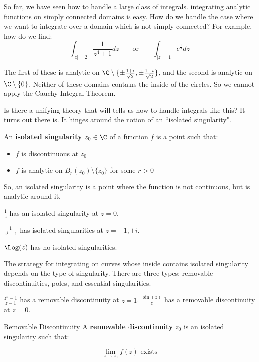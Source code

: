 So far, we have seen how to handle a large class of integrals. integrating analytic functions on simply connected domains is easy. How do we handle the case where we want to integrate over a domain which is not simply connected? For example, how do we find:
$$\int_{|z| = 2} \frac{1}{z^4 + 1}dz \qquad \text{or} \qquad \int_{|z| = 1}e^{\frac{1}{z}}dz$$

The first of these is analytic on $\C\setminus\{\pm\frac{1+i}{\sqrt{2}},\pm \frac{1-i}{\sqrt{2}}\}$, and the second is analytic on $\C\setminus\{0\}$. Neither of these domains contains the inside of the circles. So we cannot apply the Cauchy Integral Theorem.

Is there a unifying theory that will tells us how to handle integrals like this? It turns out there is. It hinges around the notion of an ``isolated singularity".

\begin{defbo}{}{}An {\bf isolated singularity} $z_0\in\C$ of a function $f$ is a point such that:

\begin{itemize} \item $f$ is discontinuous at $z_0$
\item $f$ is analytic on $B_r(z_0)\setminus\{z_0\}$ for some $r > 0$
\end{itemize}
\end{defbo}

So, an isolated singularity is a point where the function is not continuous, but is analytic around it.

\begin{ex}{}{} $\frac{1}{z}$ has an isolated singularity at $z = 0$.

$\frac{1}{z^4 - 1}$ has isolated singularities at $z= \pm 1,\pm i$.

$\Log(z)$ has no isolated singularities.
\end{ex}

The strategy for integrating on curves whose inside contains isolated singularity depends on the type of singularity. There are three types: removable discontinuities, poles, and essential singularities.

\begin{ex}{}{} $\frac{z^2 -1}{z - 1}$ has a removable discontinuity at $z = 1$. $\frac{\sin(z)}{z}$ has a removable discontinuity at $z = 0$.\end{ex}

\begin{defbo}{Removable Discontinuity}{} A {\bf removable discontinuity} $z_0$ is an isolated singularity such that:

$$\lim_{z\rightarrow z_0} f(z)\text{ exists}$$
\end{defbo}

